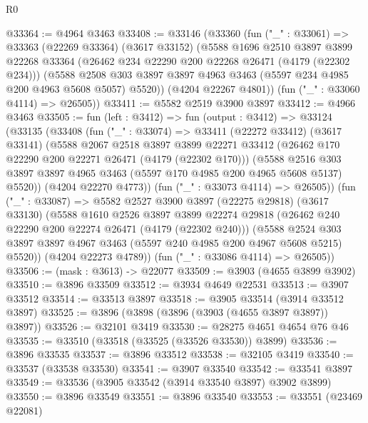 \begin{lexlean}{R0}
\begin{coremodule}
@33364 := @4964 @3463
@33408 := @33146
    (@33360
      (fun ("_" : @33061) =>
      @33363
        (@22269 @33364)
        (@3617 @33152)
        (@5588
          @1696
          @2510
          @3897
          @3899
          @22268
          @33364
          (@26462 @234 @22290 @200 @22268 @26471 (@4179 (@22302 @234)))
          (@5588
            @2508
            @303
            @3897
            @3897
            @4963
            @3463
            (@5597 @234 @4985 @200 @4963 @5608 @5057)
            @5520))
        (@4204 @22267 @4801))
      (fun ("_" : @33060 @4114) => @26505))
@33411 := @5582 @2519 @3900 @3897
@33412 := @4966 @3463
@33505 := fun (left : @3412) =>
  fun (output : @3412) =>
  @33124
    (@33135
      (@33408
        (fun ("_" : @33074) =>
        @33411
          (@22272 @33412)
          (@3617 @33141)
          (@5588
            @2067
            @2518
            @3897
            @3899
            @22271
            @33412
            (@26462 @170 @22290 @200 @22271 @26471 (@4179 (@22302 @170)))
            (@5588
              @2516
              @303
              @3897
              @3897
              @4965
              @3463
              (@5597 @170 @4985 @200 @4965 @5608 @5137)
              @5520))
          (@4204 @22270 @4773))
        (fun ("_" : @33073 @4114) => @26505))
      (fun ("_" : @33087) =>
      @5582
        @2527
        @3900
        @3897
        (@22275 @29818)
        (@3617 @33130)
        (@5588
          @1610
          @2526
          @3897
          @3899
          @22274
          @29818
          (@26462 @240 @22290 @200 @22274 @26471 (@4179 (@22302 @240)))
          (@5588
            @2524
            @303
            @3897
            @3897
            @4967
            @3463
            (@5597 @240 @4985 @200 @4967 @5608 @5215)
            @5520))
        (@4204 @22273 @4789))
      (fun ("_" : @33086 @4114) => @26505))
@33506 := (mask : @3613) -> @22077
@33509 := @3903 (@4655 @3899 @3902)
@33510 := @3896 @33509
@33512 := @3934 @4649 @22531
@33513 := @3907 @33512
@33514 := @33513 @3897
@33518 := @3905 @33514 (@3914 @33512 @3897)
@33525 := @3896 (@3898 (@3896 (@3903 (@4655 @3897 @3897)) @3897))
@33526 := @32101 @3419
@33530 := @28275 @4651 @4654 @76 @46
@33535 := @33510 (@33518 (@33525 (@33526 @33530)) @3899)
@33536 := @3896 @33535
@33537 := @3896 @33512
@33538 := @32105 @3419
@33540 := @33537 (@33538 @33530)
@33541 := @3907 @33540
@33542 := @33541 @3897
@33549 := @33536 (@3905 @33542 (@3914 @33540 @3897) @3902 @3899)
@33550 := @3896 @33549
@33551 := @3896 @33540
@33553 := @33551 (@23469 @22081)

\end{coremodule}
\end{lexlean}
